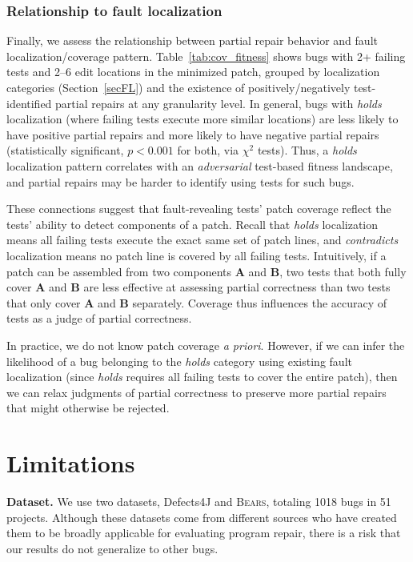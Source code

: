 \documentclass[10pt,journal,compsoc]{IEEEtran}
\newcommand\bears{\textsc{Bears}\xspace}
\begin{document}
\subsubsection{Relationship to fault localization} 
Finally, we assess the relationship between partial repair behavior and fault
localization/coverage pattern. Table~\ref{tab:cov_fitness} shows 
bugs with 2+ failing tests 
and 2--6 edit locations in the minimized patch, grouped by localization
categories (Section~\ref{secFL})
and the existence of positively/negatively
test-identified partial repairs at any granularity level.
In general, bugs with \emph{holds} localization (where failing tests execute
more similar locations) are less likely to have
positive partial repairs and more likely to have negative partial repairs (statistically significant,
$p < 0.001$ for both, via $\chi^2$ tests).
Thus, a \emph{holds} localization pattern correlates with an
\emph{adversarial} test-based fitness landscape,
and partial repairs may be harder to identify using tests for such bugs. 

These connections 
suggest that fault-revealing tests' patch coverage reflect the tests' ability
to detect components of a patch.
Recall that \emph{holds} localization means all failing tests execute 
the exact same set of patch lines, and \emph{contradicts} localization 
means no patch line is covered by all failing tests.
Intuitively, if a patch can be
assembled from two components \textbf{A} and \textbf{B}, two tests that both
fully cover \textbf{A} and \textbf{B} are less effective at assessing partial
correctness than two tests that only cover \textbf{A} and \textbf{B} separately.
Coverage thus influences the accuracy of tests as a judge of partial correctness.

In practice, we do not know patch coverage \emph{a priori}.  However, if we can infer the
likelihood of a bug belonging to the \emph{holds} category using existing 
fault localization (since \emph{holds} requires all failing tests to cover the 
entire patch), then we can relax judgments of partial correctness to 
preserve more partial repairs that might otherwise be rejected.

\section{Limitations}

\label{sec:limits}
\noindent\textbf{Dataset.}
We use two datasets, Defects4J and \bears, totaling 1018 bugs in 51 projects. 
Although these datasets come from different sources who have created them to be broadly 
applicable for evaluating program repair, there is a risk that our results do not generalize to other 
bugs.
\end{document}
